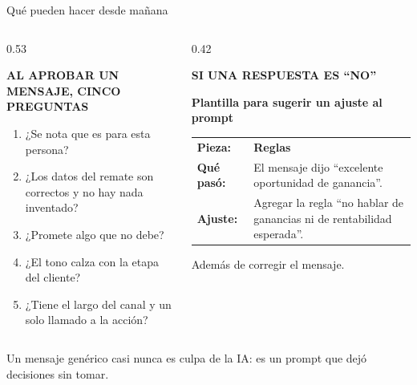 \documentclass[aspectratio=169,10pt]{beamer}
\begin{document}
\begin{frame}{Qué pueden hacer desde mañana}
\begin{columns}[T,onlytextwidth]
\begin{column}{0.53\textwidth}
{\scriptsize\bfseries\color{mitRojo}AL APROBAR UN MENSAJE, CINCO PREGUNTAS\par}
\vspace{2pt}
\begin{caja}[mitRojo]
\small
\begin{enumerate}\setlength{\itemsep}{3pt}
\item ¿Se nota que es para esta persona?
\item ¿Los datos del remate son correctos y no hay nada inventado?
\item ¿Promete algo que no debe?
\item ¿El tono calza con la etapa del cliente?
\item ¿Tiene el largo del canal y un solo llamado a la acción?
\end{enumerate}
\end{caja}
\end{column}
\begin{column}{0.42\textwidth}
{\scriptsize\bfseries\color{mitGris}SI UNA RESPUESTA ES \enquote{NO}\par}
\vspace{2pt}
\begin{tcolorbox}[colback=fondo,colframe=fondo,arc=1.5pt,left=7pt,
  right=7pt,top=5pt,bottom=5pt]
{\scriptsize\bfseries Plantilla para sugerir un ajuste al prompt\par}
\vspace{4pt}
\scriptsize
\begin{tabularx}{\linewidth}{@{}>{\bfseries}p{1.55cm}>{\raggedright\arraybackslash}X@{}}
Pieza: & \textbf{\color{pReglas}Reglas}\\[3pt]
Qué pasó: & El mensaje dijo \enquote{excelente oportunidad de
  ganancia}.\\[3pt]
Ajuste: & Agregar la regla \enquote{no hablar de ganancias ni de
  rentabilidad esperada}.\\
\end{tabularx}
\end{tcolorbox}
{\scriptsize\color{mitGris}Además de corregir el mensaje.\par}
\end{column}
\end{columns}

\vspace{0.4cm}
\begin{destacado}
\small Un mensaje genérico casi nunca es culpa de la IA: es un prompt que
dejó decisiones sin tomar.
\end{destacado}
\end{frame}
\end{document}
